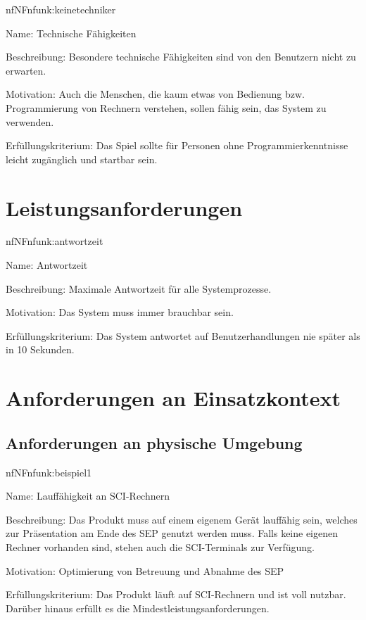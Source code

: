 \begin{description}[leftmargin=5em, style=sameline]	
	\begin{lhp}{nf}{NF}{nfunk:keinetechniker}
		\item [Name:] Technische Fähigkeiten
		\item [Beschreibung:] Besondere technische Fähigkeiten sind von den Benutzern nicht zu erwarten.
		\item [Motivation:] Auch die Menschen, die kaum etwas von Bedienung bzw. Programmierung von Rechnern verstehen, sollen fähig sein, das System zu verwenden.
		\item [Erfüllungskriterium:] Das Spiel sollte für Personen ohne Programmierkenntnisse leicht zugänglich und startbar sein.
	\end{lhp}
\end{description}

\section{Leistungsanforderungen}

\begin{description}[leftmargin=5em, style=sameline]	
	\begin{lhp}{nf}{NF}{nfunk:antwortzeit}
		\item [Name:] Antwortzeit
		\item [Beschreibung:] Maximale Antwortzeit für alle Systemprozesse.
		\item [Motivation:] Das System muss immer brauchbar sein.
		\item [Erfüllungskriterium:] Das System antwortet auf Benutzerhandlungen nie später als in 10 Sekunden.
	\end{lhp}
\end{description}

\section{Anforderungen an Einsatzkontext}

\subsection{Anforderungen an physische Umgebung}

\begin{description}[leftmargin=5em, style=sameline]	
	\begin{lhp}{nf}{NF}{nfunk:beispiel1}
		\item [Name:] Lauffähigkeit an SCI-Rechnern
		\item [Beschreibung:] Das Produkt muss auf einem eigenem Gerät lauffähig sein, welches zur Präsentation am Ende des SEP genutzt werden muss. Falls keine eigenen Rechner vorhanden sind, stehen auch die SCI-Terminals zur Verfügung.
		\item [Motivation:] Optimierung von Betreuung und Abnahme des SEP
		\item [Erfüllungskriterium:] Das Produkt läuft auf SCI-Rechnern und ist voll nutzbar. Darüber hinaus erfüllt es die Mindestleistungsanforderungen.
	\end{lhp}
\end{description}


